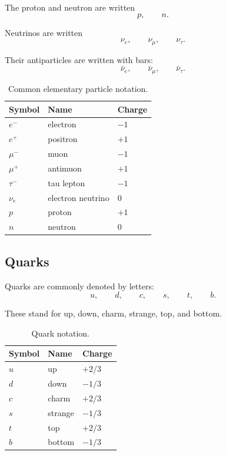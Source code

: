 \documentclass[11pt,twocolumn]{article}
\begin{document}
The proton and neutron are written
\[
p,
\qquad
n.
\]

Neutrinos are written
\[
\nu_e,
\qquad
\nu_\mu,
\qquad
\nu_\tau.
\]

Their antiparticles are written with bars:
\[
\bar{\nu}_e,
\qquad
\bar{\nu}_\mu,
\qquad
\bar{\nu}_\tau.
\]

\begin{table}[ht]
\centering
\small
\caption{Common elementary particle notation.}
\begin{tabular}{lll}
\toprule
Symbol & Name & Charge \\
\midrule
\(e^-\) & electron & \(-1\) \\
\(e^+\) & positron & \(+1\) \\
\(\mu^-\) & muon & \(-1\) \\
\(\mu^+\) & antimuon & \(+1\) \\
\(\tau^-\) & tau lepton & \(-1\) \\
\(\nu_e\) & electron neutrino & \(0\) \\
\(p\) & proton & \(+1\) \\
\(n\) & neutron & \(0\) \\
\bottomrule
\end{tabular}
\end{table}

\subsection{Quarks}

Quarks are commonly denoted by letters:
\[
u,
\qquad
d,
\qquad
c,
\qquad
s,
\qquad
t,
\qquad
b.
\]

These stand for up, down, charm, strange, top, and bottom.

\begin{table}[ht]
\centering
\small
\caption{Quark notation.}
\begin{tabular}{lll}
\toprule
Symbol & Name & Charge \\
\midrule
\(u\) & up & \(+2/3\) \\
\(d\) & down & \(-1/3\) \\
\(c\) & charm & \(+2/3\) \\
\(s\) & strange & \(-1/3\) \\
\(t\) & top & \(+2/3\) \\
\(b\) & bottom & \(-1/3\) \\
\bottomrule
\end{tabular}
\end{table}
\end{document}
